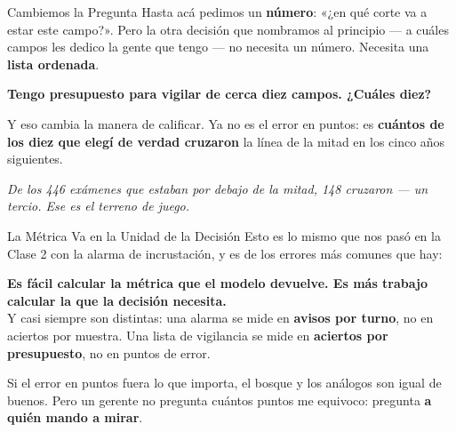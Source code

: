 \documentclass[aspectratio=169, 11pt]{beamer}
\begin{document}
\begin{frame}[shrink=8]{Cambiemos la Pregunta}
  \vspace{4pt}
  {\footnotesize\color{textMuted}
   Hasta acá pedimos un \textbf{número}: «¿en qué corte va a estar este campo?».
   Pero la otra decisión que nombramos al principio --- a cuáles campos les
   dedico la gente que tengo --- no necesita un número. Necesita una
   \textbf{lista ordenada}.}
  \vspace{8pt}
  \begin{tcolorbox}[colback=arcaGray, colframe=arcaDark, boxrule=0pt,
    leftrule=4pt, arc=3pt, left=10pt, right=10pt, top=7pt, bottom=7pt]
    {\footnotesize\color{arcaDark}\bfseries
     Tengo presupuesto para vigilar de cerca \textbf{diez} campos.
     ¿Cuáles diez?}
  \end{tcolorbox}
  \vspace{8pt}
  {\footnotesize\color{textMuted}
   Y eso cambia la manera de calificar. Ya no es el error en puntos: es
   \textbf{cuántos de los diez que elegí de verdad cruzaron} la línea de la
   mitad en los cinco años siguientes.}
  \vspace{7pt}

  {\scriptsize\color{arcaDark}\itshape
   De los 446 exámenes que estaban por debajo de la mitad, 148 cruzaron
   --- un tercio. Ese es el terreno de juego.}
\end{frame}

\begin{frame}[shrink=8]{La Métrica Va en la Unidad de la Decisión}
  \vspace{4pt}
  {\footnotesize\color{textMuted}
   Esto es lo mismo que nos pasó en la Clase 2 con la alarma de incrustación,
   y es de los errores más comunes que hay:}
  \vspace{8pt}
  \begin{tcolorbox}[colback=arcaGray, colframe=arcaRed, boxrule=0pt,
    leftrule=4pt, arc=3pt, left=10pt, right=10pt, top=7pt, bottom=7pt]
    {\footnotesize\color{arcaDark}\bfseries
     Es fácil calcular la métrica que el modelo devuelve. Es más trabajo
     calcular la que la decisión necesita.}\\[5pt]
    {\footnotesize\color{textMuted}
     Y casi siempre son distintas: una alarma se mide en \textbf{avisos por
     turno}, no en aciertos por muestra. Una lista de vigilancia se mide en
     \textbf{aciertos por presupuesto}, no en puntos de error.}
  \end{tcolorbox}
  \vspace{8pt}
  {\footnotesize\color{textMuted}
   Si el error en puntos fuera lo que importa, el bosque y los análogos son
   igual de buenos. Pero un gerente no pregunta cuántos puntos me equivoco:
   pregunta \textbf{a quién mando a mirar}.}
\end{frame}
\end{document}
